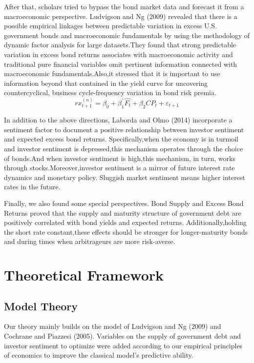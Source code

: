 \documentclass[12pt]{article}
\begin{document}
After that, scholars tried to bypass the bond market data and forecast it from a macroeconomic perspective. Ludvigson and Ng (2009)\cite{ludvigson2009macro} revealed that there is a possible empirical linkages between predictable variation in excess U.S. government bonds and macroeconomic fundamentals by using the methodology of dynamic factor analysis for large datasets.They found that strong predictable variation in excess bond returns associates with macroeconomic activity and traditional pure financial variables omit pertinent information connected with macroeconomic fundamentals.Also,it stressed that it is important to use information beyond that contained in the yield curve for uncovering countercyclical, business cycle-frequency variation in bond risk premia.
$$
rx^{(n)}_{t+1}=\beta_{0}+\beta^{'}_{1}\widehat{F_{t}}+\beta_{2}CP_{t}+\varepsilon_{t+1}
$$

In addition to the above directions, Laborda and Olmo (2014)\cite{laborda2014investor} incorporate a sentiment factor to document a positive relationship between investor sentiment and expected excess bond returns. Specifically,when the economy is in turmoil and investor sentiment is depressed,this mechanism operates through the choice of bonds.And when investor sentiment is high,this mechanism, in turn, works through stocks.Moreover,investor sentiment is a mirror of future interest rate dynamics and monetary policy. Sluggish market sentiment means higher interest rates in the future.

Finally, we also found some special perspectives. Bond Supply and Excess Bond Returns\cite{greenwood2014bond} proved that the supply and maturity structure of government debt are positively correlated with bond yields and expected returns. Additionally,holding the short rate constant,these effects should be stronger for longer-maturity bonds and during times when arbitrageurs are more risk-averse.

\section{Theoretical Framework}
\subsection{Model Theory}
\indent Our theory mainly builds on the model of Ludvigson and Ng (2009)\cite{ludvigson2009macro} and Cochrane and Piazzesi (2005)\cite{cochrane2005bond}.  Variables on the supply of government debt and investor sentiment to optimize were added according to our empirical principles of economics to improve the classical model's predictive ability.
\end{document}
